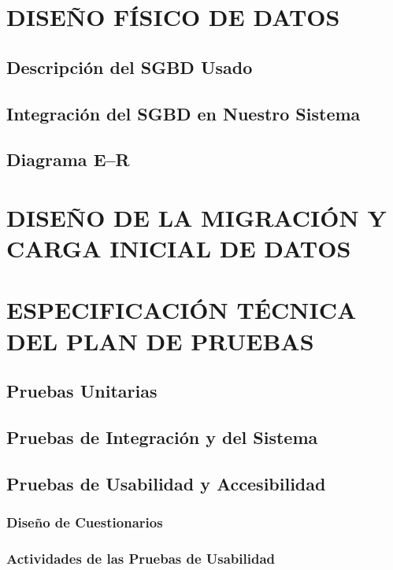 \documentclass[11pt]{report}
\begin{document}
\newpage
\section{DISEÑO FÍSICO DE DATOS}

\subsection{Descripción del SGBD Usado} 

\subsection{Integración del SGBD en Nuestro Sistema} 

\subsection{Diagrama E--R} 


\newpage
\section{DISEÑO DE LA MIGRACIÓN Y CARGA INICIAL DE DATOS}


\newpage
\section{ESPECIFICACIÓN TÉCNICA DEL PLAN DE PRUEBAS}

\subsection{Pruebas Unitarias} 

\subsection{Pruebas de Integración y del Sistema} 

\subsection{Pruebas de Usabilidad y Accesibilidad} 

\subsubsection{Diseño de Cuestionarios} 

\subsubsection{Actividades de las Pruebas de Usabilidad} 
\end{document}
